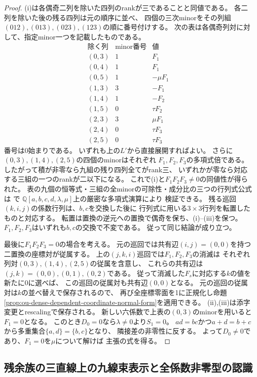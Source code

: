\begin{proof}
(i)は各偶奇二列を除いた四列のrankが三であることと同値である。
各二列を除いた後の残る四列は元の順序に並べ、
四個の三次minorをその列組$(012),(013),(023),(123)$の順に番号付けする。
次の表は各偶奇列対に対して、指定minor一つを記載したものである。
\[
\begin{array}{c|c|c|c}
\text{除く列}&\text{minor番号}&\text{値}\\ \hline
(0,3)&1&F_1\\
(0,4)&1&F_1\\
(0,5)&1&-\mu F_1\\
(1,3)&3&-F_1\\
(1,4)&1&-F_2\\
(1,5)&0&\tau F_2\\
(2,3)&3&\mu F_1\\
(2,4)&0&\tau F_3\\
(2,5)&0&\tau F_3
\end{array}
\]
番号は0始まりである。
いずれも上の$L'$から直接展開すればよい。
さらに$(0,3),(1,4),(2,5)$の四個のminorはそれぞれ
$F_1,F_2,F_3$の多項式倍である。
したがって積が非零なら九組の残り四列全てがrank三、
いずれかが零なら対応する三組の一つのrankが二以下になる。
これで(i)と$F_1F_2F_3\ne0$の同値性が得られた。
表の九個の恒等式・三組の全minorの可除性・成分比の三つの行列式公式は
で
$\mathbb Q[a,b,c,d,\lambda,\mu]$上の厳密な多項式演算により
検証できる。
残る巡回$(k,i,j)$の係数行列は、$b,c$を交換した後に
行列式に用いる$3\times3$行列を転置したものと対応する。
転置は置換の逆元への置換で偶奇を保ち、(i)--(iii)を保つ。
$F_1,F_2,F_3$はいずれも$b,c$の交換で不変である。
従って同じ結論が成り立つ。

最後に$F_1F_2F_3=0$の場合を考える。
元の巡回では共有辺$(i,j)=(0,0)$を持つ二置換の座標対が従属する。
上の$(j,k,i)$巡回では$F_1,F_2,F_3$の消滅は
それぞれ列対$(0,3),(1,4),(2,5)$の従属を含意し、
これらの共有辺は$(j,k)=(0,0),(0,1),(0,2)$である。
従って消滅した$F_s$に対応する$k$の値を新たに0に選べば、
この巡回の従属対も共有辺$(0,0)$となる。
元の巡回の従属対は$k$の並べ替えで保存されるので、
再び全座標零面を1に正規化し命題
\ref{prop:ou-dense-dependent-coordinate-normal-form}を適用できる。
(ii),(iii)は添字変更とrescalingで保存される。
新しい六係数で上表の$(0,3)$のminorを用いると$F_1=0$となる。
このとき$D_0=0$なら$\lambda\ne0$より$S_1=0$。
$ad=bc$かつ$a+d=b+c$から多重集合$\{a,d\}=\{b,c\}$となり、
隣接差の非零性に反する。
よって$D_0\ne0$であり、$F_1=0$を$\mu$について解けば
主張の式を得る。
\end{proof}

\subsection{残余族の三直線上の九線束表示と全係数非零型の認識}
\label{subsec:ou-dense-residual-three-lines}


